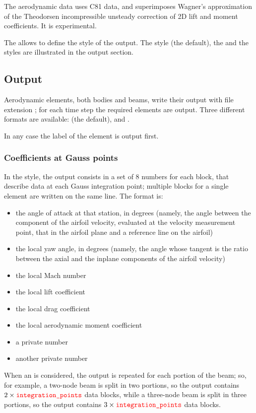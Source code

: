 The  aerodynamic data uses C81 data,
and superimposes Wagner's approximation of the Theodorsen incompressible
unsteady correction of 2D lift and moment coefficients.
It is experimental.

The  allows to define the style of the output.
The  style (the default), the  and the 
styles are illustrated in the output section.


\subsection{Output}
Aerodynamic elements, both bodies and beams, write their output with file
extension ; for each time step the required elements are output.
Three different formats are available:  (the default),
 and .

\noindent
In any case the label of the element is output first.

\subsubsection{Coefficients at Gauss points}
In the  style, the output consists in a set of 8 numbers
for each block, that describe data at each Gauss integration point;
multiple blocks for a single element are written on the same line.
The format is:
\begin{itemize}
    \item the angle of attack at that station, in degrees 
	(namely, the angle between the component of the airfoil velocity,
	evaluated at the velocity measurement point, that in the airfoil
	plane and a reference line on the airfoil)
    \item the local yaw angle, in degrees
	(namely, the angle whose tangent is the ratio
	between the axial and the inplane components of the airfoil
	velocity)
    \item the local Mach number
    \item the local lift coefficient
    \item the local drag coefficient
    \item the local aerodynamic moment coefficient
    \item a private number
    \item another private number
\end{itemize}
When an  is considered, the output 
is repeated for each portion of the beam; so, for example,
a two-node beam is split in two portions, so the output
contains $2\times \textcolor{red}{\texttt{integration\_points}}$ data blocks,
while a three-node beam is split in three portions,
so the output contains $3\times \textcolor{red}{\texttt{integration\_points}}$ data blocks.

